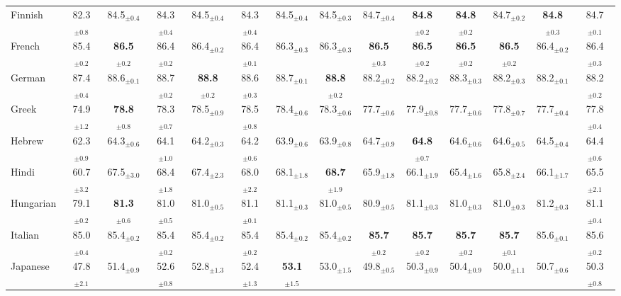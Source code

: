 \begin{table*}[ht]
{\begin{tabular}{lccccccccccccc}
Finnish & 82.3$_{\pm 0.8}$ & 84.5$_{\pm 0.4}$ & 84.3$_{\pm 0.4}$ & 84.5$_{\pm 0.4}$ & 84.3$_{\pm 0.4}$ & 84.5$_{\pm 0.4}$ & 84.5$_{\pm 0.3}$ & 84.7$_{\pm 0.4}$ & \textbf{84.8}$_{\pm 0.2}$ & \textbf{84.8}$_{\pm 0.2}$ & 84.7$_{\pm 0.2}$ & \textbf{84.8}$_{\pm 0.3}$ & 84.7$_{\pm 0.1}$ \\
French & 85.4$_{\pm 0.2}$ & \textbf{86.5}$_{\pm 0.2}$ & 86.4$_{\pm 0.2}$ & 86.4$_{\pm 0.2}$ & 86.4$_{\pm 0.1}$ & 86.3$_{\pm 0.3}$ & 86.3$_{\pm 0.3}$ & \textbf{86.5}$_{\pm 0.3}$ & \textbf{86.5}$_{\pm 0.2}$ & \textbf{86.5}$_{\pm 0.2}$ & \textbf{86.5}$_{\pm 0.2}$ & 86.4$_{\pm 0.2}$ & 86.4$_{\pm 0.3}$ \\
German & 87.4$_{\pm 0.4}$ & 88.6$_{\pm 0.1}$ & 88.7$_{\pm 0.2}$ & \textbf{88.8}$_{\pm 0.2}$ & 88.6$_{\pm 0.3}$ & 88.7$_{\pm 0.1}$ & \textbf{88.8}$_{\pm 0.2}$ & 88.2$_{\pm 0.2}$ & 88.2$_{\pm 0.2}$ & 88.3$_{\pm 0.3}$ & 88.2$_{\pm 0.3}$ & 88.2$_{\pm 0.1}$ & 88.2$_{\pm 0.2}$ \\
Greek & 74.9$_{\pm 1.2}$ & \textbf{78.8}$_{\pm 0.8}$ & 78.3$_{\pm 0.7}$ & 78.5$_{\pm 0.9}$ & 78.5$_{\pm 0.8}$ & 78.4$_{\pm 0.6}$ & 78.3$_{\pm 0.6}$ & 77.7$_{\pm 0.6}$ & 77.9$_{\pm 0.8}$ & 77.7$_{\pm 0.6}$ & 77.8$_{\pm 0.7}$ & 77.7$_{\pm 0.4}$ & 77.8$_{\pm 0.4}$ \\
Hebrew & 62.3$_{\pm 0.9}$ & 64.3$_{\pm 0.6}$ & 64.1$_{\pm 1.0}$ & 64.2$_{\pm 0.3}$ & 64.2$_{\pm 0.6}$ & 63.9$_{\pm 0.6}$ & 63.9$_{\pm 0.8}$ & 64.7$_{\pm 0.9}$ & \textbf{64.8}$_{\pm 0.7}$ & 64.6$_{\pm 0.6}$ & 64.6$_{\pm 0.5}$ & 64.5$_{\pm 0.4}$ & 64.4$_{\pm 0.6}$ \\
Hindi & 60.7$_{\pm 3.2}$ & 67.5$_{\pm 3.0}$ & 68.4$_{\pm 1.8}$ & 67.4$_{\pm 2.3}$ & 68.0$_{\pm 2.2}$ & 68.1$_{\pm 1.8}$ & \textbf{68.7}$_{\pm 1.9}$ & 65.9$_{\pm 1.8}$ & 66.1$_{\pm 1.9}$ & 65.4$_{\pm 1.6}$ & 65.8$_{\pm 2.4}$ & 66.1$_{\pm 1.7}$ & 65.5$_{\pm 2.1}$ \\
Hungarian & 79.1$_{\pm 0.2}$ & \textbf{81.3}$_{\pm 0.6}$ & 81.0$_{\pm 0.5}$ & 81.0$_{\pm 0.5}$ & 81.1$_{\pm 0.1}$ & 81.1$_{\pm 0.3}$ & 81.0$_{\pm 0.5}$ & 80.9$_{\pm 0.5}$ & 81.1$_{\pm 0.3}$ & 81.0$_{\pm 0.3}$ & 81.0$_{\pm 0.3}$ & 81.2$_{\pm 0.3}$ & 81.1$_{\pm 0.4}$ \\
Italian & 85.0$_{\pm 0.4}$ & 85.4$_{\pm 0.2}$ & 85.4$_{\pm 0.2}$ & 85.4$_{\pm 0.2}$ & 85.4$_{\pm 0.2}$ & 85.4$_{\pm 0.2}$ & 85.4$_{\pm 0.2}$ & \textbf{85.7}$_{\pm 0.2}$ & \textbf{85.7}$_{\pm 0.2}$ & \textbf{85.7}$_{\pm 0.2}$ & \textbf{85.7}$_{\pm 0.1}$ & 85.6$_{\pm 0.1}$ & 85.6$_{\pm 0.2}$ \\
Japanese & 47.8$_{\pm 2.1}$ & 51.4$_{\pm 0.9}$ & 52.6$_{\pm 0.8}$ & 52.8$_{\pm 1.3}$ & 52.4$_{\pm 1.3}$ & \textbf{53.1}$_{\pm 1.5}$ & 53.0$_{\pm 1.5}$ & 49.8$_{\pm 0.5}$ & 50.3$_{\pm 0.9}$ & 50.4$_{\pm 0.9}$ & 50.0$_{\pm 1.1}$ & 50.7$_{\pm 0.6}$ & 50.3$_{\pm 0.8}$ \\

\end{tabular}}
\end{table*}
